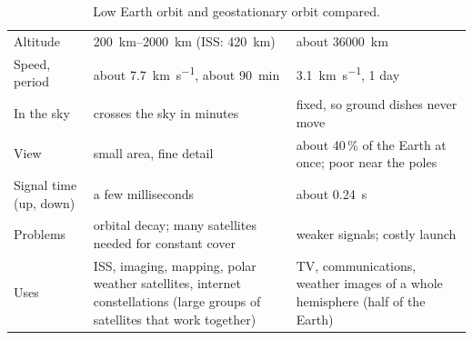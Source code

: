 \begin{table}
  \caption{Low Earth orbit and geostationary orbit compared.}\label{ch4:tab:leogeo}
  \centering
  \small
  \begin{tabular}{@{}L{28mm}L{56mm}L{56mm}@{}}
    \toprule
     &  & \\
    \midrule
    Altitude & \qtyrange{200}{2000}{km} (ISS: \qty{420}{km}) & about \qty{36000}{km}\\
    Speed, period & about \qty{7.7}{km.s^{-1}}, about \qty{90}{min} & \qty{3.1}{km.s^{-1}}, 1 day\\
    In the sky & crosses the sky in minutes & fixed, so ground dishes never move\\
    View & small area, fine detail & about 40\,\% of the Earth at once; poor near the poles\\
    Signal time (up, down) & a few milliseconds & about \qty{0.24}{s}\\
    Problems & orbital decay; many satellites needed for constant cover & weaker signals; costly launch\\
    Uses & ISS, imaging, mapping, polar weather satellites, internet constellations (large groups
      of satellites that work together)
      & TV, communications, weather images of a whole hemisphere (half of the Earth)\\
    \bottomrule
  \end{tabular}
\end{table}

